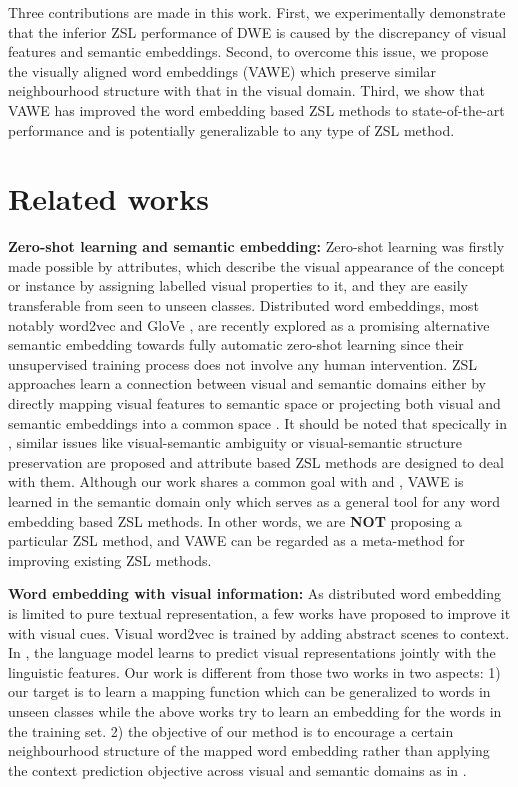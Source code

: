 \documentclass{bmvc2k}
\begin{document}
Three contributions are made in this work. First, we experimentally demonstrate that the inferior ZSL performance of DWE is caused by the discrepancy of visual features and semantic embeddings. Second, to overcome this issue, we propose the visually aligned word embeddings (VAWE) which preserve similar neighbourhood structure with that in the visual domain. Third, we show that VAWE has improved the word embedding based ZSL methods to state-of-the-art performance and is potentially generalizable to any type of ZSL method.

\section{Related works}
\label{sec: rel_work}{\bf Zero-shot learning and semantic embedding:} Zero-shot learning was firstly made possible by attributes\cite{Lampert09unseen,Farhadi09describingobjects}, which describe the visual appearance of the concept or instance by assigning labelled visual properties to it, and they are easily transferable from seen to unseen classes. Distributed word embeddings, most notably word2vec \cite{word2vec} and GloVe \cite{glove}, are recently explored \cite{SocherNIPS2013,Frome2013NIPS_devise,NorouziConse13} as a promising alternative semantic embedding towards fully automatic zero-shot learning since their unsupervised training process does not involve any human intervention. ZSL approaches learn a connection between visual and semantic domains either by directly mapping visual features to semantic space \cite{SocherNIPS2013,NorouziConse13,fu2016semi} or projecting both visual and semantic embeddings into a common space \cite{Akata13label,Frome2013NIPS_devise,Romera2015ZSL,Akata15output,LatEm2016,Zhang2016CVPR, LongBMVC16, SaumyaBMVC15, LiICCV15}. It should be noted that specically in \cite{LongBMVC16, LongCVPR17}, similar issues like visual-semantic ambiguity or visual-semantic structure preservation are proposed and attribute based ZSL methods are designed to deal with them. Although our work shares a common goal with \cite{LongBMVC16} and \cite{LongCVPR17}, VAWE is learned in the semantic domain only which serves as a general tool for any word embedding based ZSL methods. In other words, we are {\bf NOT} proposing a particular ZSL method, and VAWE can be regarded as a meta-method for improving existing ZSL methods.

{\bf Word embedding with visual information:} As distributed word embedding is limited to pure textual representation, a few works have proposed to improve it with visual cues. Visual word2vec \cite{Kottur_2016_CVPR} is trained by adding abstract scenes to context.  In \cite{Lazaridou_combine_vs2015}, the language model learns to predict visual representations jointly with the linguistic features. Our work is different from those two works in two aspects: 1) our target is to learn a mapping function which can be generalized to words in unseen classes while the above works try to learn an embedding for the words in the training set. 2) the objective of our method is to encourage a certain neighbourhood structure of the mapped word embedding rather than applying the context prediction objective across visual and semantic domains as in \cite{Kottur_2016_CVPR,Lazaridou_combine_vs2015}.
\end{document}
